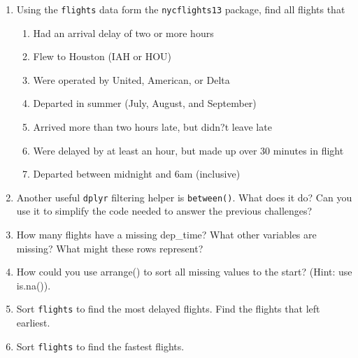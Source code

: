 \documentclass[12pt]{article}
\begin{document}
\begin{enumerate}
    \item Using the {\tt flights} data form the {\tt nycflights13} package,  find all flights that
    \begin{enumerate}
      \item Had an arrival delay of two or more hours
      \item Flew to Houston (IAH or HOU)
      \item Were operated by United, American, or Delta
      \item Departed in summer (July, August, and September)
      \item Arrived more than two hours late, but didn?t leave late
      \item Were delayed by at least an hour, but made up over 30 minutes in flight
      \item Departed between midnight and 6am (inclusive)
    \end{enumerate}
    \item Another useful {\tt dplyr} filtering helper is {\tt between()}. What does it do? Can you use it to simplify the code needed to answer the previous challenges?
    \item How many flights have a missing dep\_time? What other variables are missing? What might these rows represent?
    \item How could you use arrange() to sort all missing values to the start? (Hint: use is.na()).
    \item Sort {\tt flights} to find the most delayed flights. Find the flights that left earliest.
    \item Sort {\tt flights} to find the fastest flights.
  \end{enumerate}
\end{document}
